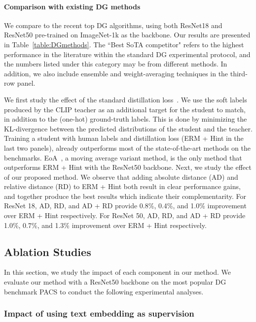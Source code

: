\documentclass[10pt,twocolumn,letterpaper]{article}
\begin{document}
\vspace{-10pt}
\paragraph{Comparison with existing DG methods} 
We compare to the recent top DG algorithms, using both ResNet18 and ResNet50 pre-trained on ImageNet-1k as the backbone. Our results are presented in Table~\ref{table:DGmethods}. The ``Best SoTA competitor" refers to the highest performance in the literature within the standard DG experimental protocol, and the numbers listed under this category may be from different methods. In addition, we also include ensemble and weight-averaging techniques in the third-row panel.

We first study the effect of the standard distillation loss~\cite{hinton2015distilling}. We use the soft labels produced by the CLIP teacher as an additional target for the student to match, in addition to the (one-hot) ground-truth labels. This is done by minimizing the KL-divergence between the predicted distributions of the student and the teacher. Training a student with human labels and distillation loss (ERM + Hint in the last two panels), already outperforms most of the state-of-the-art methods on the benchmarks. EoA~\cite{arpit2021ensemble}, a moving average variant method, is the only method that outperforms ERM + Hint with the ResNet50 backbone.  
Next, we study the effect of our proposed method. We observe that adding absolute distance (AD) and relative distance (RD) to ERM + Hint both result in clear performance gains, and together produce the best results which indicate their complementarity. For ResNet 18, AD, RD, and AD + RD provide 0.8\%, 0.4\%, and 1.0\% improvement over ERM + Hint respectively. For ResNet 50, AD, RD, and AD + RD provide 1.0\%, 0.7\%, and 1.3\% improvement over ERM + Hint respectively.





\subsection{Ablation Studies}

In this section, we study the impact of each component in our method. We evaluate our method with a ResNet50 backbone on the most popular DG benchmark PACS to conduct the following experimental analyses.

\subsubsection{Impact of using text embedding as supervision}
\end{document}
